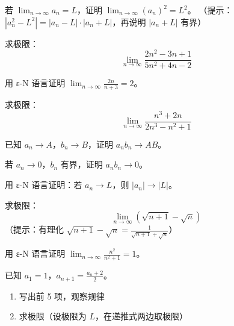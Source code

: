 \begin{exercise}[2]
若 \(\displaystyle \lim_{n\to\infty} a_n = L\)，证明 \(\displaystyle \lim_{n\to\infty} (a_n)^2 = L^2\)。
（提示：\(|a_n^2 - L^2| = |a_n - L| \cdot |a_n + L|\)，再说明 \(|a_n + L|\) 有界）
\end{exercise}

\begin{exercise}[2]
求极限：
\[
\lim_{n\to\infty} \frac{2n^2 - 3n + 1}{5n^2 + 4n - 2}
\]
\end{exercise}


\begin{exercise}[3]
用 ε-N 语言证明 \(\displaystyle \lim_{n\to\infty} \frac{2n}{n+3} = 2\)。
\end{exercise}

\begin{exercise}[3]
求极限：
\[
\lim_{n\to\infty} \frac{n^3 + 2n}{2n^3 - n^2 + 1}
\]
\end{exercise}

\begin{exercise}[3]
已知 \(a_n \to A\)，\(b_n \to B\)，证明 \(a_n b_n \to AB\)。
\end{exercise}

\begin{exercise}[3]
若 \(a_n \to 0\)，\(b_n\) 有界，证明 \(a_n b_n \to 0\)。
\end{exercise}

\begin{exercise}[3]
用 ε-N 语言证明：若 \(a_n \to L\)，则 \(|a_n| \to |L|\)。
\end{exercise}


\begin{exercise}[4]
求极限：
\[
\lim_{n\to\infty} (\sqrt{n+1} - \sqrt{n})
\]
（提示：有理化 \(\sqrt{n+1} - \sqrt{n} = \frac{1}{\sqrt{n+1} + \sqrt{n}}\)）
\end{exercise}

\begin{exercise}[4]
用 ε-N 语言证明 \(\displaystyle \lim_{n\to\infty} \frac{n^2}{n^2 + 1} = 1\)。
\end{exercise}

\begin{exercise}[4]
已知 \(a_1 = 1\)，\(a_{n+1} = \frac{a_n + 2}{2}\)。
\begin{enumerate}
  \item[(1)] 写出前 5 项，观察规律
  \item[(2)] 求极限（设极限为 \(L\)，在递推式两边取极限）
\end{enumerate}
\end{exercise}

